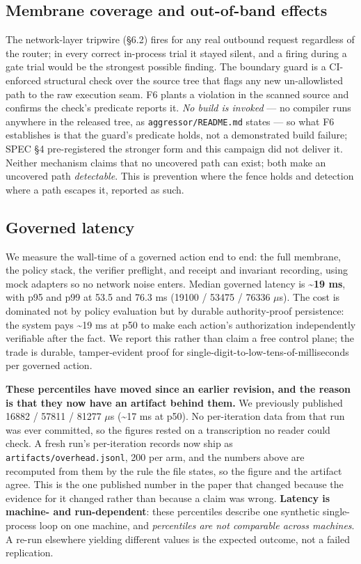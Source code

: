 \documentclass[11pt]{article}
\begin{document}
\subsection{Membrane coverage and out-of-band effects}\label{membrane-coverage-and-out-of-band-effects}

The network-layer tripwire (\S6.2) fires for any real outbound request regardless of the
router; in every correct in-process trial it stayed silent, and a firing during a gate trial
would be the strongest possible finding. The boundary guard is a CI-enforced structural check over
the source tree that flags any new un-allowlisted path to the raw execution seam. F6 plants a
violation in the scanned source and confirms the check's predicate reports it. \emph{No build is
invoked} --- no compiler runs anywhere in the released tree, as \texttt{aggressor/README.md}
states --- so what F6 establishes is that the guard's predicate holds, not a demonstrated build
failure; SPEC \S4 pre-registered the stronger form and this campaign did not deliver it. Neither mechanism claims that no uncovered path can
exist; both make an uncovered path \emph{detectable}. This is prevention where the fence holds and
detection where a path escapes it, reported as such.

\subsection{Governed latency}\label{overhead}

We measure the wall-time of a governed action end to end: the full membrane, the policy stack, the
verifier preflight, and receipt and invariant recording, using mock adapters so no network noise
enters. Median governed latency is \textbf{\textasciitilde19 ms}, with p95 and p99 at 53.5 and
76.3 ms (19100 / 53475 / 76336 $\mu$s). The cost is dominated not by policy evaluation but by
durable authority-proof persistence: the system pays \textasciitilde19 ms at p50 to make each
action's authorization independently verifiable after the fact. We report this rather than claim a
free control plane; the trade is durable, tamper-evident proof for
single-digit-to-low-tens-of-milliseconds per governed action.

\textbf{These percentiles have moved since an earlier revision, and the reason is that they now
have an artifact behind them.} We previously published 16882 / 57811 / 81277 $\mu$s
(\textasciitilde17 ms at p50). No per-iteration data from that run was ever committed, so the
figures rested on a transcription no reader could check. A fresh run's per-iteration records now
ship as \texttt{artifacts/overhead.jsonl}, 200 per arm, and the numbers above are recomputed from
them by the rule the file states, so the figure and the artifact agree. This is the one published
number in the paper that changed because the evidence for it changed rather than because a claim
was wrong. \textbf{Latency is machine- and run-dependent}: these percentiles describe one synthetic
single-process loop on one machine, and \emph{percentiles are not comparable across machines}. A
re-run elsewhere yielding different values is the expected outcome, not a failed replication.
\end{document}
